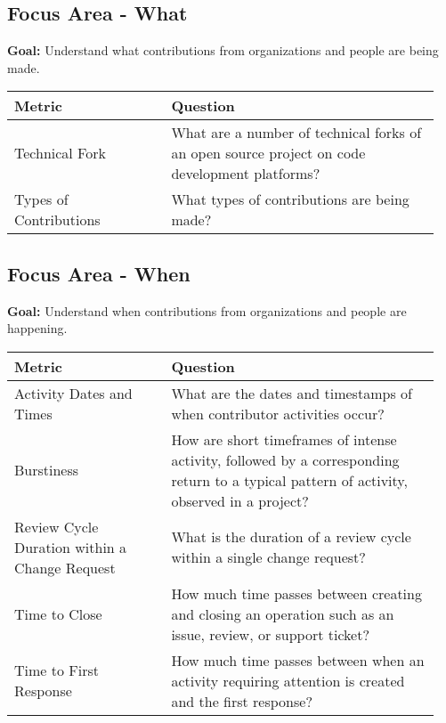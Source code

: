 


\subsection{Focus Area - What}
\textbf{Goal:} Understand what contributions from organizations and people are being made.
\begin{table}[ht!]
	\centering
	\begin{tabular}{|p{0.35\linewidth} | p{0.6\linewidth}|}
			\hline
			\hfil \textbf{Metric}  & \hfil \textbf{Question} \\ 
			\hline		
			Technical Fork & What are a number of technical forks of an open source project on code development platforms? \\
			\hline
			Types of Contributions & What types of contributions are being made? \\
			\hline
	\end{tabular}
\end{table}


\subsection{Focus Area - When}
\textbf{Goal:} Understand when contributions from organizations and people are happening.
\begin{table}[ht]
	\centering
	\begin{tabular}{|p{0.35\linewidth} | p{0.6\linewidth}|}
		\hline
		\hfil \textbf{Metric} & \hfil \textbf{Question} \\ 
		\hline	
		Activity Dates and Times & What are the dates and timestamps of when contributor activities occur? \\
		\hline
		Burstiness & How are short timeframes of intense activity, followed by a corresponding return to a typical pattern of activity, observed in a project? \\ 
		\hline		
		Review Cycle Duration within a Change Request & What is the duration of a review cycle within a single change request? \\ 
		\hline 
		Time to Close & How much time passes between creating and closing an operation such as an issue, review, or support ticket? \\
		\hline
		Time to First Response & How much time passes between when an activity requiring attention is created and the first response? \\
		\hline
	\end{tabular}
\end{table}


